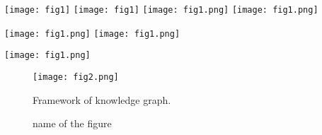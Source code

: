 \documentclass{article}
\begin{document}
	
	\texttt{[image: fig1]}
	\texttt{[image: fig1]}
	\texttt{[image: fig1.png]}
	\texttt{[image: fig1.png]}
	
	\texttt{[image: fig1.png]}
	\texttt{[image: fig1.png]}
	
	\texttt{[image: fig1.png]}
	
	
	\begin{figure*}[ht]
		\centering
		\texttt{[image: fig2.png]}
		\caption{Framework of knowledge graph.}
		\label{fig2}
	\end{figure*}



\begin{figure}[htbp]
	\centering    %
	\caption{name of the figure}        %
	\label{fig-1}  %
\end{figure}
\end{document}
